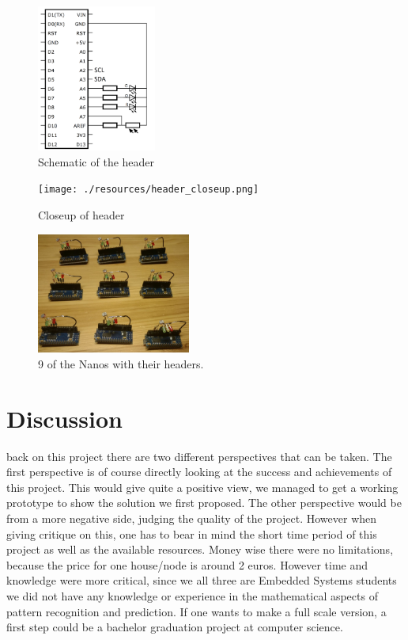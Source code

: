 \documentclass[a4paper,journal]{DDREAM}
\begin{document}
\begin{figure}[H]
\centering
    \includegraphics[width=0.35\textwidth]{./resources/schematic.png}
    \caption{Schematic of the header}
    \label{fig:schematic}
\end{figure}

\begin{figure}[H]
\centering
    \texttt{[image: ./resources/header\_closeup.png]}
    \caption{Closeup of header}
    \label{fig:header}
\end{figure}

\begin{figure}[H]
\centering
    \includegraphics[width=0.45\textwidth]{./resources/nanos.jpg}
    \caption{9 of the Nanos with their headers.}
    \label{fig:nanos}
\end{figure}

\vspace{1cm}
\section{Discussion}\label{sec:discussion}
 back on this project there are two different perspectives that can be taken.
The first perspective is of course directly looking at the success and achievements of this project.
This would give quite a positive view, we managed to get a working prototype to show the solution we first proposed.
The other perspective would be from a more negative side, judging the quality of the project.
However when giving critique on this, one has to bear in mind the short time period of this project as well as the available resources.
Money wise there were no limitations, because the price for one house/node is around 2 euros.
However time and knowledge were more critical, since we all three are Embedded Systems students we did not have any knowledge or experience in the mathematical aspects of pattern recognition and prediction.
If one wants to make a full scale version, a first step could be a bachelor graduation project at computer science.
\end{document}
